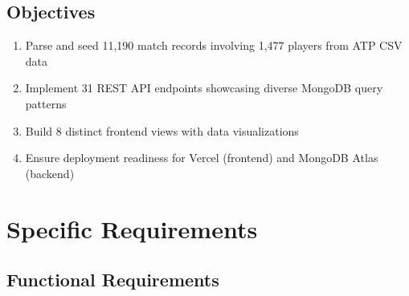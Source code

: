 \documentclass[12pt,a4paper]{article}
\begin{document}
\newpage
\subsection{Objectives}
\begin{enumerate}[noitemsep]
    \item Parse and seed 11,190 match records involving 1,477 players from ATP CSV data
    \item Implement 31 REST API endpoints showcasing diverse MongoDB query patterns
    \item Build 8 distinct frontend views with data visualizations
    \item Ensure deployment readiness for Vercel (frontend) and MongoDB Atlas (backend)
\end{enumerate}


\newpage
\section{Specific Requirements}

\subsection{Functional Requirements}
\end{document}
